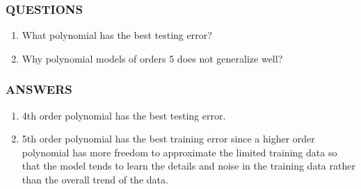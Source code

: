 \documentclass[11pt]{article}
\begin{document}
    \hypertarget{questions}{%
\subsubsection{QUESTIONS}\label{questions}}

\begin{enumerate}
\def\labelenumi{(\arabic{enumi})}
\item
  What polynomial has the best testing error?
\item
  Why polynomial models of orders 5 does not generalize well?
\end{enumerate}

    \hypertarget{answers}{%
\subsubsection{ANSWERS}\label{answers}}

\begin{enumerate}
\def\labelenumi{(\arabic{enumi})}
\item
  4th order polynomial has the best testing error.
\item
  5th order polynomial has the best training error since a higher order
  polynomial has more freedom to approximate the limited training data
  so that the model tends to learn the details and noise in the training
  data rather than the overall trend of the data.
\end{enumerate}


    
    
    
    
\end{document}
